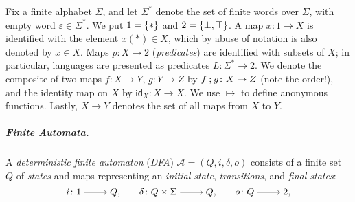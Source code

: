 \documentclass[a4paper, UKenglish, numberwithinsect, thm-restate, cleveref, final]{lipics-v2021}
\theoremstyle{plain}
\theoremstyle{definition}
\newcommand{\seq}{\ensuremath{\mathbin{\text{\upshape;}}}}
\newcommand{\id}{\ensuremath{\mathsf{id}}}
\newcommand{\A}{\ensuremath{\mathcal{A}}\xspace}
\newcommand{\set}[2][]{\ifthenelse{\equal{#2}{}}{\ensuremath{{#1\emptyset}}}{\ensuremath{{#1\{#2#1\}}}}}
\numberwithin{equation}{section}
\begin{document}
\begin{notn} Fix a finite alphabet $\Sigma$, and let $\Sigma^*$ denote the set of finite words over $\Sigma$, with empty word $\varepsilon \in \Sigma^{*}$. We put $1 = \set{\ast}$ and $2 = \set{\bot,\top}$. A map $x \colon 1\to X$ is identified with the element $x(\ast) \in X$, which by abuse of notation is also denoted by \(x \in X\). Maps $p\colon X\to 2$ (\emph{predicates}) are identified  with subsets of $X$; in particular, languages are presented as predicates $L\colon \Sigma^*\to 2$. We denote the composite of two maps $f\colon X\to Y$, $g\colon Y\to Z$ by $f\seq g\colon X\to Z$ (note the order!), and the identity map on $X$ by $\id_X\colon X\to X$.  We use $\mapsto$ to define anonymous functions.
  Lastly, $X\to Y$ denotes the set of all maps from $X$ to $Y$.
\end{notn}
\subparagraph{Finite Automata.} A \emph{deterministic finite automaton} (\emph{DFA}) $\A = (Q,i,\delta,o)$ consists of a finite set $Q$ of \emph{states} and maps representing an \emph{initial state}, \emph{transitions}, and \emph{final states}:
\begin{equation*}
  i\colon
  \begin{tikzcd}[cramped]
    1
    \arrow{r}
    & Q,
  \end{tikzcd}
  \qquad
  \delta\colon
  \begin{tikzcd}[cramped]
    Q\times \Sigma
    \arrow{r}
    & Q,
  \end{tikzcd}
  \qquad
  o\colon
  \begin{tikzcd}[cramped]
    Q
    \arrow{r}
    & 2,
  \end{tikzcd}
\end{equation*}
\end{document}
